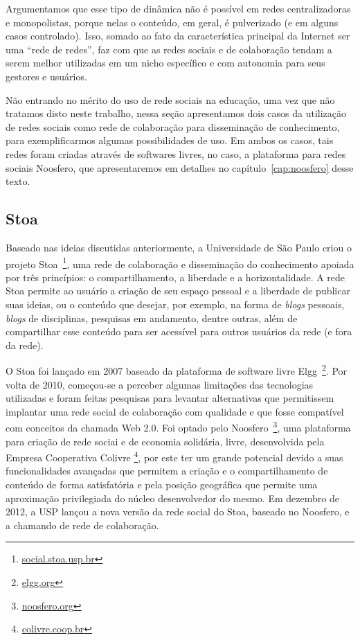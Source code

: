 Argumentamos que esse tipo de dinâmica não é possível em redes centralizadoras e monopolistas,
porque nelas o conteúdo, em geral, é pulverizado (e em alguns casos controlado).
Isso, somado ao fato da característica principal da Internet ser uma ``rede de redes'',
faz com que as redes sociais e de colaboração tendam a serem melhor utilizadas
em um nicho específico e com autonomia para seus gestores e usuários.

Não entrando no mérito do uso de rede sociais na educação, uma vez que não tratamos disto neste trabalho,
nessa seção apresentamos dois casos da utilização de redes sociais como rede de
colaboração para disseminação de conhecimento, para exemplificarmos algumas possibilidades de uso.
%
Em ambos os casos, tais redes foram criadas através de softwares livres, no caso, a  plataforma para 
redes sociais Noosfero, que apresentaremos em detalhes no capítulo~\ref{cap:noosfero} desse texto.

\subsection{Stoa}

Baseado nas ideias discutidas anteriormente, a Universidade de São Paulo criou o
projeto Stoa~\footnote{\url{social.stoa.usp.br}}, uma rede de colaboração e
disseminação do conhecimento apoiada por três princípios: o compartilhamento, a
liberdade e a horizontalidade.
%
A rede Stoa permite ao usuário a criação de seu espaço pessoal e a liberdade de
publicar suas ideias, ou o conteúdo que desejar, por exemplo, na forma de
\textit{blogs} pessoais, \textit{blogs} de disciplinas, pesquisas em andamento,
dentre outras, além de compartilhar esse conteúdo para ser acessível
para outros usuários da rede (e fora da rede).

O Stoa foi lançado em 2007 baseado da plataforma de software livre
Elgg~\footnote{\url{elgg.org}}.
%
Por volta de 2010, começou-se a perceber algumas limitações das tecnologias
utilizadas e foram feitas pesquisas para levantar alternativas que permitissem
implantar uma rede social de colaboração com qualidade e que fosse compatível
com conceitos da chamada Web 2.0.
%
Foi optado pelo Noosfero~\footnote{\url{noosfero.org}}, uma plataforma para
criação de rede sociai e de economia solidária, livre, desenvolvida pela
Empresa Cooperativa Colivre \footnote{\url{colivre.coop.br}}, por este ter um
grande potencial devido a suas funcionalidades avançadas que permitem a criação
e o compartilhamento de conteúdo de forma satisfatória e pela posição geográfica
que permite uma aproximação privilegiada do núcleo desenvolvedor do mesmo.
%
Em dezembro de 2012, a USP lançou a nova versão da rede social do Stoa, baseado
no Noosfero, e a chamando de rede de colaboração.

